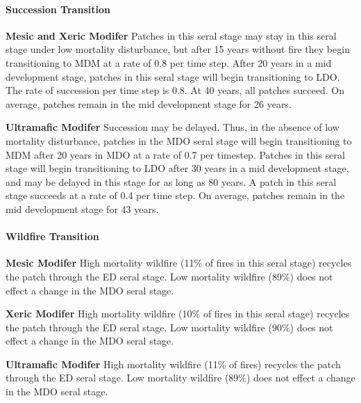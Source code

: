 \paragraph{Succession Transition}
\begin{adjustwidth}{2cm}{}
\textbf{Mesic and Xeric Modifer } Patches in this seral stage may stay in this seral stage under low mortality disturbance, but after 15 years without fire they begin transitioning to MDM at a rate of 0.8 per time step. After 20 years in a mid development stage, patches in this seral stage will begin transitioning to LDO. The rate of succession per time step is 0.8. At 40 years, all patches succeed. On average, patches remain in the mid development stage for 26 years.


\medskip
\noindent \textbf{Ultramafic Modifer}  Succession may be delayed. Thus, in the absence of low mortality disturbance, patches in the MDO seral stage will begin transitioning to MDM after 20 years in MDO at a rate of 0.7 per timestep. Patches in this seral stage will begin transitioning to LDO after 30 years in a mid development stage, and may be delayed in this stage for as long as 80 years. A patch in this seral stage succeeds at a rate of 0.4 per time step. On average, patches remain in the mid development stage for 43 years.

\end{adjustwidth}
\paragraph{Wildfire Transition}
\begin{adjustwidth}{2cm}{}
\textbf{Mesic Modifer } High mortality wildfire (11\% of fires in this seral stage) recycles the patch through the ED seral stage. Low mortality wildfire (89\%) does not effect a change in the MDO seral stage.


\medskip
\noindent \textbf{Xeric Modifer}  High mortality wildfire (10\% of fires in this seral stage) recycles the patch through the ED seral stage. Low mortality wildfire (90\%) does not effect a change in the MDO seral stage.


\medskip
\noindent \textbf{Ultramafic Modifer} High mortality wildfire (11\% of fires) recycles the patch through the ED seral stage. Low mortality wildfire (89\%) does not effect a change in the MDO seral stage.

\end{adjustwidth}

\noindent\hrulefill

